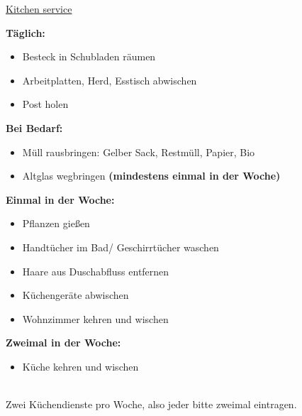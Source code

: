 


	
\pagestyle{empty}
{\Large\underline{Kitchen service}}
\newline

\raggedright
\begin{minipage}{8cm}
	\textbf{Täglich:}
	\begin{itemize}
		\item Besteck in Schubladen räumen
		\item Arbeitplatten, Herd, Esstisch abwischen
		\item Post holen
	\end{itemize}

	\textbf{Bei Bedarf:}
	\begin{itemize}
		\item Müll rausbringen: Gelber Sack, Restmüll, Papier, Bio
		\item Altglas wegbringen \textbf{(mindestens einmal in der Woche)}
	\end{itemize}
\end{minipage}
\raggedright
\begin{minipage}{8cm}
	\textbf{Einmal in der Woche:}
	\begin{itemize}
		\item Pflanzen gießen
		\item Handtücher im Bad/ Geschirrtücher waschen
		\item Haare aus Duschabfluss entfernen
		\item Küchengeräte abwischen
		\item Wohnzimmer kehren und wischen
	\end{itemize}
		\textbf{Zweimal in der Woche:}
	\begin{itemize}
		\item Küche kehren und wischen
	\end{itemize}
\end{minipage}
\vspace{2cm}

\\
Zwei Küchendienste pro Woche, also jeder bitte zweimal eintragen.

